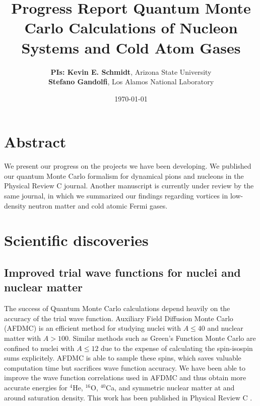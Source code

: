 \documentclass[12pt,letterpaper]{article}
\newcommand{\project}{\large Progress Report \vskip 0.1cm}
\begin{document}
\onehalfspacing
\title{\project {\large \textbf{Quantum Monte Carlo Calculations of Nucleon 
Systems and Cold Atom Gases}} \vspace{-0.5cm}}
\author{
{\bf PIs: Kevin E. Schmidt}, Arizona State University \\
{\bf Stefano Gandolfi}, Los Alamos National Laboratory
}
\date{\today}
\maketitle

\vspace{-1.5cm}
\section*{Abstract}
\vspace{-0.25cm}
We present our progress on the projects we have been developing.
We published our
quantum Monte Carlo formalism for dynamical pions and nucleons
in the
Physical 
Review C journal.
Another manuscript is currently under review by the same journal,
in which
we summarized
our findings regarding vortices in low-density neutron matter
and cold atomic Fermi gases.
\vspace{-0.25cm}
\section{Scientific discoveries}%

\subsection{Improved trial wave functions for nuclei and nuclear matter}
The success of Quantum Monte Carlo calculations depend heavily on the accuracy of the trial wave function. Auxiliary Field Diffusion Monte Carlo (AFDMC) is an efficient method for studying nuclei with $A\le40$ and nuclear matter with $A>100$. Similar methods such as Green's Function Monte Carlo are confined to nuclei with $A\le12$ due to the expense of calculating the spin-isospin sums explicitely. AFDMC is able to sample these spins, which saves valuable computation time but sacrifices wave function accuracy. We have been able to improve the wave function correlations used in AFDMC and thus obtain more accurate energies for $^4$He, $^{16}$O, $^{40}$Ca, and symmetric nuclear matter at and around saturation density. This work has been published in Physical Review C \cite{lon18}.
\end{document}
